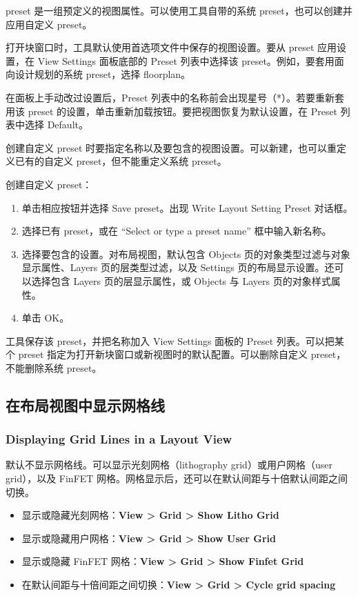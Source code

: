 preset 是一组预定义的视图属性。可以使用工具自带的系统 preset，也可以创建并应用自定义 preset。

打开块窗口时，工具默认使用首选项文件中保存的视图设置。要从 preset 应用设置，在 View Settings 面板底部的 Preset 列表中选择该 preset。例如，要套用面向设计规划的系统 preset，选择 floorplan。

在面板上手动改过设置后，Preset 列表中的名称前会出现星号（*）。若要重新套用该 preset 的设置，单击重新加载按钮。要把视图恢复为默认设置，在 Preset 列表中选择 Default。

创建自定义 preset 时要指定名称以及要包含的视图设置。可以新建，也可以重定义已有的自定义 preset，但不能重定义系统 preset。

创建自定义 preset：
\begin{enumerate}
  \item 单击相应按钮并选择 Save preset。出现 Write Layout Setting Preset 对话框。
  \item 选择已有 preset，或在 “Select or type a preset name” 框中输入新名称。
  \item 选择要包含的设置。对布局视图，默认包含 Objects 页的对象类型过滤与对象显示属性、Layers 页的层类型过滤，以及 Settings 页的布局显示设置。还可以选择包含 Layers 页的层显示属性，或 Objects 与 Layers 页的对象样式属性。
  \item 单击 OK。
\end{enumerate}

工具保存该 preset，并把名称加入 View Settings 面板的 Preset 列表。可以把某个 preset 指定为打开新块窗口或新视图时的默认配置。可以删除自定义 preset，不能删除系统 preset。

\subsection{在布局视图中显示网格线}
\subsubsection*{Displaying Grid Lines in a Layout View}

默认不显示网格线。可以显示光刻网格（lithography grid）或用户网格（user grid），以及 FinFET 网格。网格显示后，还可以在默认间距与十倍默认间距之间切换。
\begin{itemize}
  \item 显示或隐藏光刻网格：\textbf{View > Grid > Show Litho Grid}
  \item 显示或隐藏用户网格：\textbf{View > Grid > Show User Grid}
  \item 显示或隐藏 FinFET 网格：\textbf{View > Grid > Show Finfet Grid}
  \item 在默认间距与十倍间距之间切换：\textbf{View > Grid > Cycle grid spacing}
\end{itemize}

